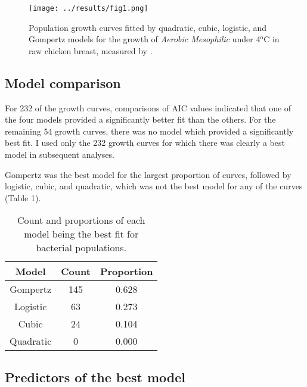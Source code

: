 \documentclass[11pt]{article}
\newcommand{\supersc}[1]{\ensuremath{^{\textrm{#1}}}}
\begin{document}
	\begin{figure}[htbp]
		\centering
		\texttt{[image: ../results/fig1.png]}
		\caption{Population growth curves fitted by quadratic, cubic, logistic, and Gompertz models for the growth of \textit{Aerobic Mesophilic} under 4\supersc{o}C in raw chicken breast, measured by \cite{bae2014growth}.}
		\label{fig1}
	\end{figure}
	
	
	\subsection{Model comparison}
	
	For 232 of the growth curves, comparisons of AIC values indicated that one of the four models provided a significantly better fit than the others. For the remaining 54 growth curves, there was no model which provided a significantly best fit. I used only the 232 growth curves for which there was clearly a best model in subsequent analyses. 
	
	Gompertz was the best model for the largest proportion of curves, followed by logistic, cubic, and quadratic, which was not the best model for any of the curves (Table 1).

	\begin{table}[htbp] 
		\caption{Count and proportions of each model being the best fit for bacterial populations.}
		\centering      %
		\begin{tabular}{c c c}  %
			\hline                        %
			Model & Count & Proportion \\ [0.5ex] %
			\hline                    %
			Gompertz & 145 & 0.628  \\
			Logistic & 63 & 0.273 \\ 
			Cubic & 24 & 0.104 \\ 
			Quadratic & 0 & 0.000 \\ 
			 [0.5ex]
			\hline     %
		\end{tabular} 
		\label{table1}  %
	\end{table} 

	
	\subsection{Predictors of the best model}
	
\end{document}
